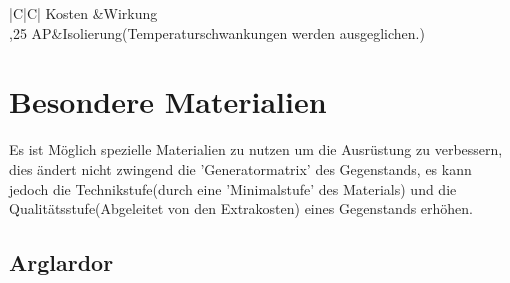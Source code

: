 \begin{tabulary}{\textwidth}{|C|C|}
\hline 
Kosten &Wirkung \\ 
,25 AP&Isolierung(Temperaturschwankungen werden ausgeglichen.)\\
\hline 
\end{tabulary}

\section{Besondere Materialien}
Es ist Möglich spezielle Materialien zu nutzen um die Ausrüstung zu verbessern, dies ändert nicht zwingend die 'Generatormatrix' des Gegenstands, es kann jedoch die Technikstufe(durch eine 'Minimalstufe' des Materials) und die Qualitätsstufe(Abgeleitet von den Extrakosten) eines Gegenstands erhöhen.
\subsection{Arglardor}
